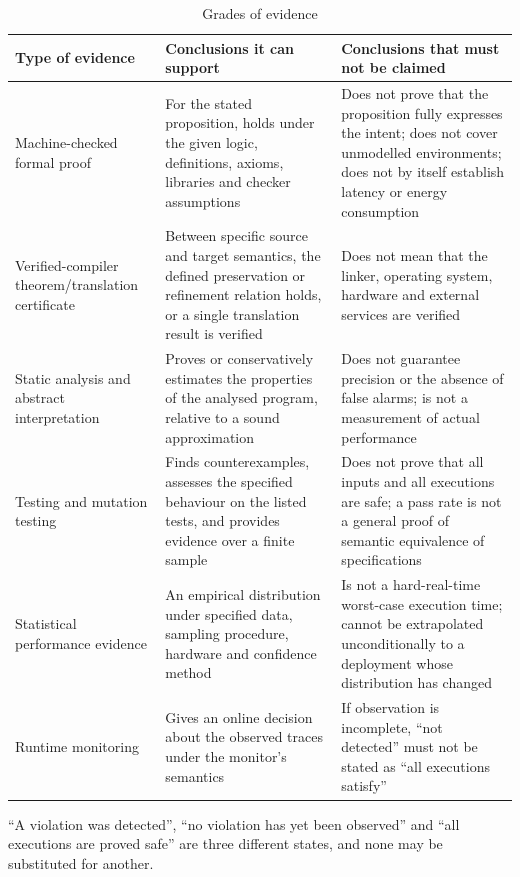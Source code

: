 \begin{table}[htbp]
\centering
\footnotesize
\caption{Grades of evidence}\label{tab:evidence}
\begin{tabular}{L{2.6cm}L{5.6cm}L{6.2cm}}
\toprule
\textbf{Type of evidence} & \textbf{Conclusions it can support} &
  \textbf{Conclusions that must not be claimed} \\
\midrule
Machine-checked formal proof & For the stated proposition, holds under the given logic,
  definitions, axioms, libraries and checker assumptions &
  Does not prove that the proposition fully expresses the intent; does not cover unmodelled
  environments; does not by itself establish latency or energy consumption \\
Verified-compiler theorem/translation certificate & Between specific source and target
  semantics, the defined preservation or refinement relation holds, or a single translation
  result is verified &
  Does not mean that the linker, operating system, hardware and external services are
  verified \\
Static analysis and abstract interpretation & Proves or conservatively estimates the
  properties of the analysed program, relative to a sound approximation &
  Does not guarantee precision or the absence of false alarms; is not a measurement of
  actual performance \\
Testing and mutation testing & Finds counterexamples, assesses the specified behaviour on
  the listed tests, and provides evidence over a finite sample &
  Does not prove that all inputs and all executions are safe; a pass rate is not a general
  proof of semantic equivalence of specifications \\
Statistical performance evidence & An empirical distribution under specified data, sampling
  procedure, hardware and confidence method &
  Is not a hard-real-time worst-case execution time; cannot be extrapolated unconditionally
  to a deployment whose distribution has changed \\
Runtime monitoring & Gives an online decision about the observed traces under the monitor's
  semantics &
  If observation is incomplete, ``not detected'' must not be stated as ``all executions
  satisfy'' \\
\bottomrule
\end{tabular}
\end{table}

\begin{principle}\label{pr:three-states}
``A violation was detected'', ``no violation has yet been observed'' and ``all executions
are proved safe'' are three different states, and none may be substituted for another.
\end{principle}

